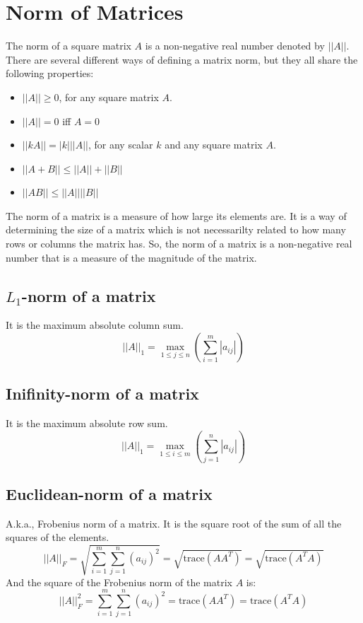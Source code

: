 \documentclass[conference,final,11pt,technote,onecolumn]{IEEEtran}\usepackage[]{graphicx}\usepackage[]{color}
\begin{document}
\section{Norm of Matrices}
\label{term:norm_of_matrices}
The norm of a square matrix $A$ is a non-negative real number denoted by $||A||$. There are several different ways of defining a matrix norm, but they all share the following properties:
\begin{itemize}
\item $||A||\ge 0$, for any square matrix $A$.
\item $||A|| = 0$ iff $A = 0$
\item $||kA|| = |k|||A||$, for any scalar $k$ and any square matrix $A$.
\item $||A+B|| \le ||A|| + ||B||$
\item $||AB||\le ||A||||B||$
\end{itemize}
The norm of a matrix is a measure of how large its elements are. It is a way of determining the size of a matrix which is not necessarilty related to how many rows or columns the matrix has. So, the norm of a matrix is a non-negative real number that is a measure of the magnitude of the matrix.

\subsection{$L_1$-norm of a matrix}
\label{term:l1_norm_of_a_matrix}
It is the maximum absolute column sum.
\begin{equation}
\nonumber ||A||_1 = \max_{1\le j\le n}\left( \sum_{i=1}^m|a_{ij}|\right)
\end{equation}

\subsection{Inifinity-norm of a matrix}
\label{term:infinity_norm_of_a_matrix}
It is the maximum absolute row sum.
\begin{equation}
\nonumber ||A||_1 = \max_{1\le i\le m}\left( \sum_{j=1}^n|a_{ij}|\right)
\end{equation}

\subsection{Euclidean-norm of a matrix}
\label{term:euclidean_norm_of_a_matrix}
A.k.a., Frobenius norm of a matrix. It is the square root of the sum of all the squares of the elements.
\begin{equation}
\nonumber ||A||_F = \sqrt{ \sum_{i=1}^m\sum_{j=1}^n (a_{ij})^2 } = \sqrt{\text{trace}(AA^T)} = \sqrt{\text{trace}(A^TA)}
\end{equation}
And the square of the Frobenius norm of the matrix $A$ is:
\begin{equation}
\nonumber ||A||^2_F =  \sum_{i=1}^m\sum_{j=1}^n (a_{ij})^2  = \text{trace}(AA^T) = \text{trace}(A^TA)
\end{equation}
\end{document}

